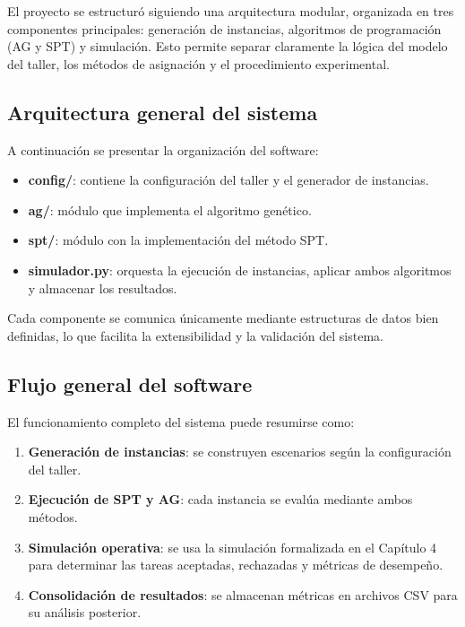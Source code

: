 El proyecto se estructuró siguiendo una arquitectura modular, organizada en tres componentes principales: generación de instancias, algoritmos de programación (AG y SPT) y simulación. Esto permite separar claramente la lógica del modelo del taller, los métodos de asignación y el procedimiento experimental.

\subsection{Arquitectura general del sistema}

A continuación se presentar la organización del software:

\begin{itemize}
    \item \textbf{config/}: contiene la configuración del taller y el generador de instancias.  
    \item \textbf{ag/}: módulo que implementa el algoritmo genético.  
    \item \textbf{spt/}: módulo con la implementación del método SPT.  
    \item \textbf{simulador.py}: orquesta la ejecución de instancias, aplicar ambos algoritmos y almacenar los resultados.  
\end{itemize}

Cada componente se comunica únicamente mediante estructuras de datos bien definidas, lo que facilita la extensibilidad y la validación del sistema.

\subsection{Flujo general del software}

El funcionamiento completo del sistema puede resumirse como:

\begin{enumerate}
    \item \textbf{Generación de instancias}: se construyen escenarios según la configuración del taller.
    \item \textbf{Ejecución de SPT y AG}: cada instancia se evalúa mediante ambos métodos.
    \item \textbf{Simulación operativa}: se usa la simulación formalizada en el Capítulo 4 para determinar las tareas aceptadas, rechazadas y métricas de desempeño.
    \item \textbf{Consolidación de resultados}: se almacenan métricas en archivos CSV para su análisis posterior.
\end{enumerate}

